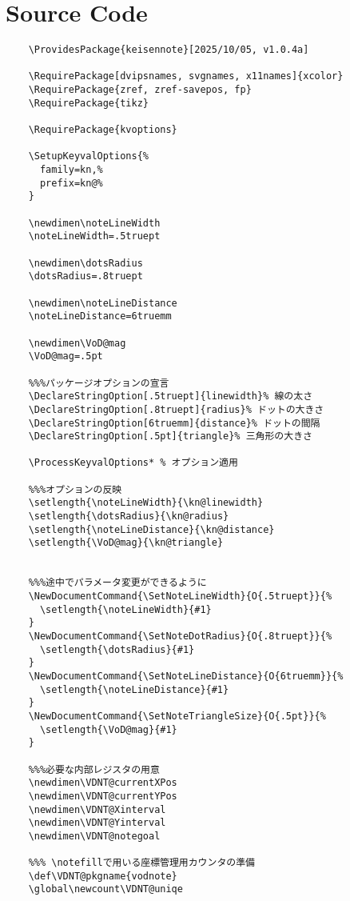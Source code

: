 \documentclass[a4paper,12pt]{article}
\begin{document}
\section{Source Code}
  \begin{lstlisting}
    \ProvidesPackage{keisennote}[2025/10/05, v1.0.4a]

    \RequirePackage[dvipsnames, svgnames, x11names]{xcolor}
    \RequirePackage{zref, zref-savepos, fp}
    \RequirePackage{tikz}

    \RequirePackage{kvoptions} 

    \SetupKeyvalOptions{%
      family=kn,%
      prefix=kn@%
    }

    \newdimen\noteLineWidth
    \noteLineWidth=.5truept

    \newdimen\dotsRadius
    \dotsRadius=.8truept

    \newdimen\noteLineDistance
    \noteLineDistance=6truemm

    \newdimen\VoD@mag
    \VoD@mag=.5pt

    %%%パッケージオプションの宣言
    \DeclareStringOption[.5truept]{linewidth}% 線の太さ
    \DeclareStringOption[.8truept]{radius}% ドットの大きさ
    \DeclareStringOption[6truemm]{distance}% ドットの間隔
    \DeclareStringOption[.5pt]{triangle}% 三角形の大きさ

    \ProcessKeyvalOptions* % オプション適用

    %%%オプションの反映
    \setlength{\noteLineWidth}{\kn@linewidth}
    \setlength{\dotsRadius}{\kn@radius}
    \setlength{\noteLineDistance}{\kn@distance}
    \setlength{\VoD@mag}{\kn@triangle}


    %%%途中でパラメータ変更ができるように
    \NewDocumentCommand{\SetNoteLineWidth}{O{.5truept}}{%
      \setlength{\noteLineWidth}{#1}
    }
    \NewDocumentCommand{\SetNoteDotRadius}{O{.8truept}}{%
      \setlength{\dotsRadius}{#1}
    }
    \NewDocumentCommand{\SetNoteLineDistance}{O{6truemm}}{%
      \setlength{\noteLineDistance}{#1}
    }
    \NewDocumentCommand{\SetNoteTriangleSize}{O{.5pt}}{%
      \setlength{\VoD@mag}{#1}
    }

    %%%必要な内部レジスタの用意
    \newdimen\VDNT@currentXPos
    \newdimen\VDNT@currentYPos
    \newdimen\VDNT@Xinterval
    \newdimen\VDNT@Yinterval
    \newdimen\VDNT@notegoal

    %%% \notefillで用いる座標管理用カウンタの準備
    \def\VDNT@pkgname{vodnote}
    \global\newcount\VDNT@uniqe



\end{lstlisting}
\end{document}
